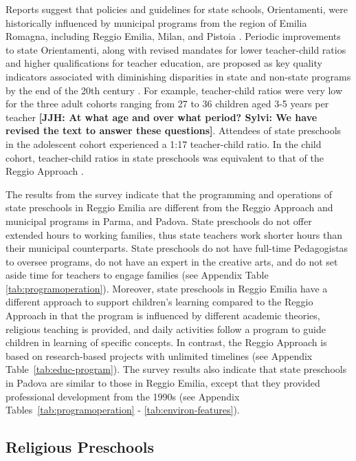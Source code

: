 Reports suggest that policies and guidelines for state schools, Orientamenti, were historically influenced by municipal programs from the region of Emilia Romagna, including Reggio Emilia, Milan, and Pistoia \citep{OECD_2001_Italy-Country-Note}. Periodic improvements to state Orientamenti, along with revised mandates for lower teacher-child ratios and higher qualifications for teacher education, are proposed as key quality indicators associated with diminishing disparities in state and non-state programs by the end of the 20th century \citep{Hohnerlein_2015_Development-and-Diffusion}. For example, teacher-child ratios were very low for the three adult cohorts ranging from 27 to 36 children aged 3-5 years per teacher \textbf{[JJH: At what age and over what period? Sylvi: We have revised the text to answer these questions]}. Attendees of state preschools in the adolescent cohort experienced a 1:17 teacher-child ratio. In the child cohort, teacher-child ratios in state preschools was equivalent to that of the Reggio Approach \citep{Hohnerlein_2015_Development-and-Diffusion}.

The results from the survey indicate that the programming and operations of state preschools in Reggio Emilia are different from the Reggio Approach and municipal programs in Parma, and Padova. State preschools do not offer extended hours to working families, thus state teachers work shorter hours than their municipal counterparts. State preschools do not have full-time Pedagogistas to oversee programs, do not have an expert in the creative arts, and do not set aside time for teachers to engage families (see Appendix Table \ref{tab:programoperation}). Moreover, state preschools in Reggio Emilia have a different approach to support children's learning compared to the Reggio Approach in that the program is  influenced by different academic theories, religious teaching is provided, and daily activities follow a program to guide children in learning of specific concepts. In contrast, the Reggio Approach is based on research-based projects with unlimited timelines (see Appendix Table~\ref{tab:educ-program}). The survey results also indicate that state preschools in Padova are similar to those in Reggio Emilia, except that they provided professional development from the 1990s (see Appendix Tables~\ref{tab:programoperation} - \ref{tab:environ-features}).

\subsection{Religious Preschools}


